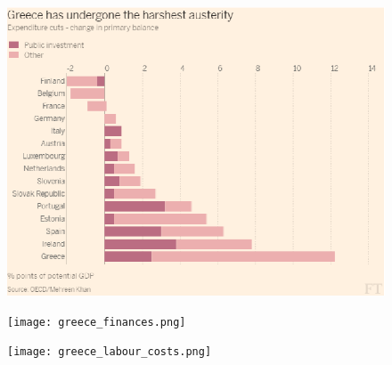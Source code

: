 \documentclass{beamer}
\begin{document}
\begin{frame}
  \begin{figure}
    \includegraphics[scale=.9]{austerity}
  \end{figure}
\end{frame}

\begin{frame}
  \begin{figure}
    \texttt{[image: greece\_finances.png]}
  \end{figure}
\end{frame}

\begin{frame}
  \begin{figure}
    \texttt{[image: greece\_labour\_costs.png]}
  \end{figure}
\end{frame}

\end{document}
